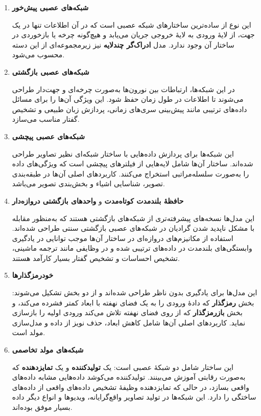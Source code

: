 \begin{enumerate}
	\item \textbf{شبکه‌های عصبی پیش‌خور}
	
	این نوع از ساده‌ترین ساختارهای شبکه عصبی است که در آن اطلاعات تنها در یک جهت، از لایهٔ ورودی به لایهٔ خروجی جریان می‌یابد و هیچ‌گونه چرخه یا بازخوردی در ساختار آن وجود ندارد. مدل \textbf{ادراک‌گر چندلایه} نیز زیرمجموعه‌ای از این دسته محسوب می‌شود.
	
	\item \textbf{شبکه‌های عصبی بازگشتی}
	
	در این شبکه‌ها، ارتباطات بین نورون‌ها به‌صورت چرخه‌ای و جهت‌دار طراحی می‌شوند تا اطلاعات در طول زمان حفظ شود. این ویژگی آن‌ها را برای مسائل داده‌های ترتیبی مانند پیش‌بینی سری‌های زمانی، پردازش زبان طبیعی و تشخیص گفتار مناسب می‌سازد.
	
	\item \textbf{شبکه‌های عصبی پیچشی}
	
	این شبکه‌ها برای پردازش داده‌هایی با ساختار شبکه‌ای نظیر تصاویر طراحی شده‌اند. ساختار آن‌ها شامل لایه‌هایی از فیلترهای پیچشی است که ویژگی‌های داده را به‌صورت سلسله‌مراتبی استخراج می‌کنند. کاربردهای اصلی آن‌ها در طبقه‌بندی تصویر، شناسایی اشیاء و بخش‌بندی تصویر می‌باشد.
	
	\item \textbf{حافظهٔ بلندمدت کوتاه‌مدت} و \textbf{واحدهای بازگشتی دروازه‌دار}
	
	این مدل‌ها نسخه‌های پیشرفته‌تری از شبکه‌های بازگشتی هستند که به‌منظور مقابله با مشکل ناپدید شدن گرادیان در شبکه‌های عصبی بازگشتی سنتی طراحی شده‌اند. استفاده از مکانیزم‌های دروازه‌ای در ساختار آن‌ها موجب توانایی در یادگیری وابستگی‌های بلندمدت در داده‌های ترتیبی شده و در وظایفی مانند ترجمه ماشینی، تشخیص احساسات و تشخیص گفتار بسیار کارآمد هستند.
	
	\item \textbf{خودرمزگذارها}
	
	این مدل‌ها برای یادگیری بدون ناظر طراحی شده‌اند و از دو بخش تشکیل می‌شوند: بخش \textbf{رمزگذار} که دادهٔ ورودی را به یک فضای نهفته با ابعاد کمتر فشرده می‌کند، و بخش \textbf{بازرمزگذار} که از روی فضای نهفته تلاش می‌کند ورودی اولیه را بازسازی نماید. کاربردهای اصلی آن‌ها شامل کاهش ابعاد، حذف نویز از داده و مدل‌سازی مولد است.
	
	\item \textbf{شبکه‌های مولد تخاصمی}
	
	این ساختار شامل دو شبکهٔ عصبی است: یک \textbf{تولیدکننده} و یک \textbf{تمایزدهنده} که به‌صورت رقابتی آموزش می‌بینند. تولیدکننده می‌کوشد داده‌هایی مشابه داده‌های واقعی بسازد، در حالی که تمایزدهنده وظیفهٔ تشخیص داده‌های واقعی از داده‌های ساختگی را دارد. این شبکه‌ها در تولید تصاویر واقع‌گرایانه، ویدیوها و انواع دیگر داده بسیار موفق بوده‌اند.
\end{enumerate}


